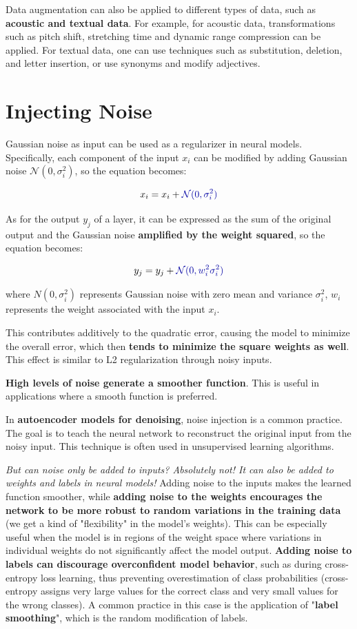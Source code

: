 Data augmentation can also be applied to different types of data, such as \textbf{acoustic and textual data}. For example, for acoustic data, transformations such as pitch shift, stretching time and dynamic range compression can be applied. For textual data, one can use techniques such as substitution, deletion, and letter insertion, or use synonyms and modify adjectives.

\section{Injecting Noise}

Gaussian noise as input can be used as a regularizer in neural models. Specifically, each component of the input \( x_i \) can be modified by adding Gaussian noise \( \mathcal{N}(0, \sigma_i^2) \), so the equation becomes:

$$ x_i = x_i + \textcolor{mybluee}{\mathcal{N}(0, \sigma_i^2)} $$

As for the output \( y_j \) of a layer, it can be expressed as the sum of the original output and the Gaussian noise \textbf{amplified by the weight squared}, so the equation becomes:

$$ y_j = y_j + \textcolor{mybluee}{\mathcal{N}(0, w_i^2 \sigma_i^2)} $$

where \( N(0, \sigma_i^2) \) represents Gaussian noise with zero mean and variance \( \sigma_i^2 \), \( w_i \) represents the weight associated with the input \( x_i \).

This contributes additively to the quadratic error, causing the model to minimize the overall error, which then \textbf{tends to minimize the square weights as well}. This effect is similar to L2 regularization through noisy inputs. 

\textbf{High levels of noise generate a smoother function}. This is useful in applications where a smooth function is preferred.

In \textbf{autoencoder models for denoising}, noise injection is a common practice. The goal is to teach the neural network to reconstruct the original input from the noisy input. This technique is often used in unsupervised learning algorithms.

\textit{But can noise only be added to inputs? Absolutely not! It can also be added to weights and labels in neural models!} Adding noise to the inputs makes the learned function smoother, while \textbf{adding noise to the weights encourages the network to be more robust to random variations in the training data} (we get a kind of "flexibility" in the model's weights). This can be especially useful when the model is in regions of the weight space where variations in individual weights do not significantly affect the model output. \textbf{Adding noise to labels can discourage overconfident model behavior}, such as during cross-entropy loss learning, thus preventing overestimation of class probabilities (cross-entropy assigns very large values for the correct class and very small values for the wrong classes). A common practice in this case is the application of "\textbf{label smoothing}", which is the random modification of labels.

